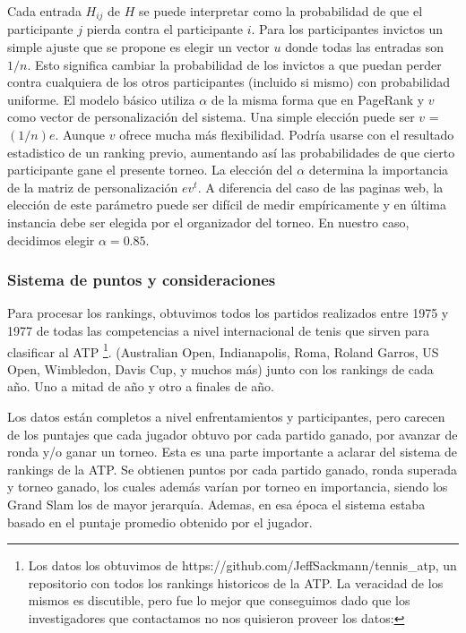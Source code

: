 Cada entrada $H_{ij}$ de $H$ se puede interpretar como la probabilidad de que el participante $j$ pierda contra el participante $i$. Para los participantes invictos un simple ajuste que se propone es elegir un vector $u$ donde todas las entradas son $1/n$. Esto significa cambiar la probabilidad de los invictos a que puedan perder contra cualquiera de los otros participantes (incluido si mismo) con probabilidad uniforme.
El modelo básico utiliza $\alpha$ de la misma forma que en PageRank y $v$ como vector de personalización del sistema. Una simple elección puede ser $v$ = $(1/n)e$. Aunque $v$ ofrece mucha más flexibilidad. Podría usarse con el resultado estadistico de un ranking previo, aumentando así las probabilidades de que cierto participante gane el presente torneo.
La elección del $\alpha$ determina la importancia de la matriz de personalización $ev^t$. A diferencia del caso de las paginas web, la elección de este parámetro puede ser difícil de medir empíricamente y en última instancia debe ser elegida por el organizador del torneo. En nuestro caso, decidimos elegir $\alpha = 0.85$.	 

\subsubsection{Sistema de puntos y consideraciones}

Para procesar los rankings, obtuvimos todos los partidos realizados entre 1975 y 1977 de todas las competencias a nivel internacional de tenis que sirven para clasificar al ATP \footnote{Los datos los obtuvimos de https://github.com/JeffSackmann/tennis\_atp, un repositorio con todos los rankings historicos de la ATP. La veracidad de los mismos es discutible, pero fue lo mejor que conseguimos dado que los investigadores que contactamos no nos quisieron proveer los datos: }. (Australian Open, Indianapolis, Roma, Roland Garros, US Open, Wimbledon, Davis Cup, y muchos más) junto con los rankings de cada año. Uno a mitad de año y otro a finales de año. 

Los datos están completos a nivel enfrentamientos y participantes, pero carecen de los puntajes que cada jugador obtuvo por cada partido ganado, por avanzar de ronda y/o ganar un torneo.
Esta es una parte importante a aclarar del sistema de rankings de la ATP. Se obtienen puntos por cada partido ganado, ronda superada y torneo ganado, los cuales además varían por torneo en importancia, siendo los Grand Slam los de mayor jerarquía. Ademas, en esa época el sistema estaba basado en el puntaje promedio obtenido por el jugador.

